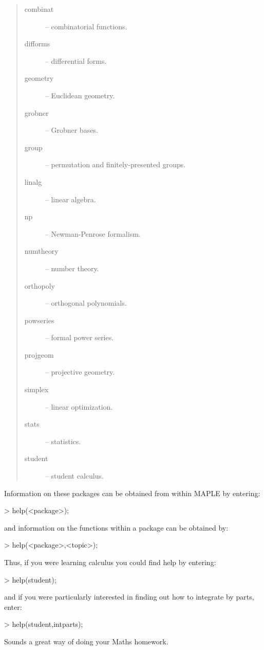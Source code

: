 \documentclass[twoside,11pt]{starlink}
\begin{document}
\begin{quote}
\begin{description}

\item [combinat] -- combinatorial functions.
\item [difforms] -- differential forms.
\item [geometry] -- Euclidean geometry.
\item [grobner] -- Grobner bases.
\item [group] -- permutation and finitely-presented groups.
\item [linalg] -- linear algebra.
\item [np] -- Newman-Penrose formalism.
\item [numtheory] -- number theory.
\item [orthopoly] -- orthogonal polynomials.
\item [powseries] -- formal power series.
\item [projgeom] -- projective geometry.
\item [simplex] -- linear optimization.
\item [stats] -- statistics.
\item [student] -- student calculus.

\end{description}
\end{quote}

Information on these packages can be obtained from within MAPLE by
entering:

\begin{terminalv}
> help(<package>);
\end{terminalv}

and information on the functions within a package can be obtained by:

\begin{terminalv}
> help(<package>,<topic>);
\end{terminalv}

Thus, if you were learning calculus you could find help by entering:

\begin{terminalv}
> help(student);
\end{terminalv}

and if you were particularly interested in finding out how to integrate
by parts, enter:

\begin{terminalv}
> help(student,intparts);
\end{terminalv}

Sounds a great way of doing your Maths homework.

\end{document}
